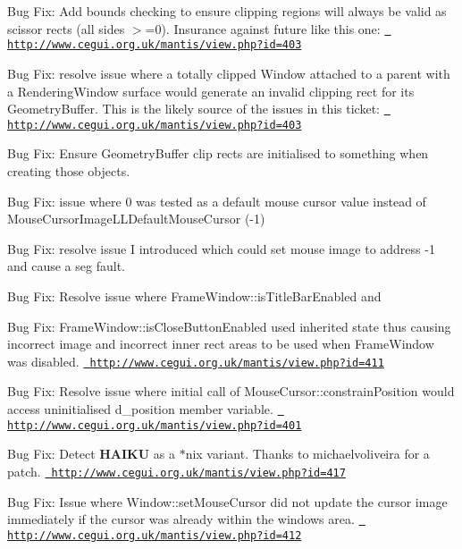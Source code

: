 \begin{DoxyItemize}
\item Bug Fix\+: Add bounds checking to ensure clipping regions will always be valid as scissor rects (all sides $>$=0). Insurance against future like this one\+: \href{http://www.cegui.org.uk/mantis/view.php?id=403}{\texttt{ http\+://www.\+cegui.\+org.\+uk/mantis/view.\+php?id=403}}
\item Bug Fix\+: resolve issue where a totally clipped Window attached to a parent with a Rendering\+Window surface would generate an invalid clipping rect for it\textquotesingle{}s Geometry\+Buffer. This is the likely source of the issues in this ticket\+: \href{http://www.cegui.org.uk/mantis/view.php?id=403}{\texttt{ http\+://www.\+cegui.\+org.\+uk/mantis/view.\+php?id=403}}
\item Bug Fix\+: Ensure Geometry\+Buffer clip rects are initialised to something when creating those objects.
\item Bug Fix\+: issue where \textquotesingle{}0\textquotesingle{} was tested as a default mouse cursor value instead of Mouse\+Cursor\+Image\+L\+L\+Default\+Mouse\+Cursor (-\/1)
\item Bug Fix\+: resolve issue I introduced which could set mouse image to address -\/1 and cause a seg fault.
\item Bug Fix\+: Resolve issue where Frame\+Window\+::is\+Title\+Bar\+Enabled and
\item Bug Fix\+: Frame\+Window\+::is\+Close\+Button\+Enabled used inherited state thus causing incorrect image and incorrect inner rect areas to be used when Frame\+Window was disabled. \href{http://www.cegui.org.uk/mantis/view.php?id=411}{\texttt{ http\+://www.\+cegui.\+org.\+uk/mantis/view.\+php?id=411}}
\item Bug Fix\+: Resolve issue where initial call of Mouse\+Cursor\+::constrain\+Position would access uninitialised d\+\_\+position member variable. \href{http://www.cegui.org.uk/mantis/view.php?id=401}{\texttt{ http\+://www.\+cegui.\+org.\+uk/mantis/view.\+php?id=401}}
\item Bug Fix\+: Detect {\bfseries{H\+A\+I\+KU}} as a $\ast$nix variant. Thanks to michaelvoliveira for a patch. \href{http://www.cegui.org.uk/mantis/view.php?id=417}{\texttt{ http\+://www.\+cegui.\+org.\+uk/mantis/view.\+php?id=417}}
\item Bug Fix\+: Issue where Window\+::set\+Mouse\+Cursor did not update the cursor image immediately if the cursor was already within the window\textquotesingle{}s area. \href{http://www.cegui.org.uk/mantis/view.php?id=412}{\texttt{ http\+://www.\+cegui.\+org.\+uk/mantis/view.\+php?id=412}}

\end{DoxyItemize}
